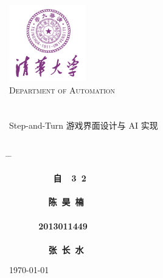 


\begin{titlepage}
\begin{center}
\includegraphics[width=0.25\textwidth]{pic/logo.jpg}\\[1cm]
\textsc{\LARGE Department of Automation}\\[1.5cm]
\\[0.5cm]
\hrulefill
\\[0.8cm]{\centering \huge \hei Step-and-Turn 游戏界面设计与 AI 实现}\\[0.4cm]
\hrulefill
\\[4cm]

\begin{tabbing}       %

 \hspace*{5cm} \= \hspace{2.6cm} \= \kill

\>  {\centering\fs\sihao\textbf{~~~~~~~~~自~~3~2}} \\
\\
\>  {\centering\fs\sihao\textbf{~~~~~~~~陈~昊~楠}}\\
\\
\>  {\centering\fs\sihao\textbf{~~~~~~2013011449}}\\
\\
\>  {\centering\fs\sihao\textbf{~~~~~~~~张~长~水}} \\

\end{tabbing}
\vfill
{\large \today}
\end{center}
\end{titlepage}

